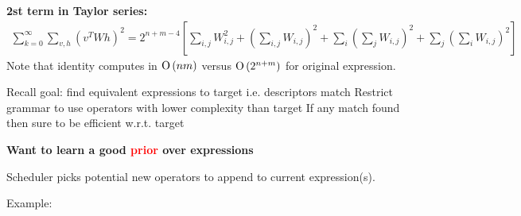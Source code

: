 \documentclass[landscape,a0b]{a0poster_csml_v2}
\begin{document}
\begin{poster}
\begin{PosterColumn}
  {\bf 2st term in Taylor series:}
  \begin{align*}
    \sum_{k=0}^\infty \sum_{v,h} (v^TWh)^2 = 2^{n + m - 4} [\sum_{i, j}W_{i, j}^2 + (\sum_{i, j} W_{i, j})^2 + \sum_i (\sum_j W_{i, j})^2 + \sum_j (\sum_i W_{i, j})^2]
  \end{align*}
  Note that identity computes in $\operatorname{O}\left(nm\right)$ versus $\operatorname{O}\left(2^{n + m}\right)$ for original expression.
\vspace{0.7cm}



Recall goal: find equivalent expressions to target
i.e. descriptors match
Restrict grammar to use operators with lower complexity than target
If any match found then sure to be efficient w.r.t. target
\vspace{-0.8cm}
\begin{center}
{\bf Want to learn a good \textcolor{red}{prior} over expressions}
\end{center}

\vspace{-0.2cm}
\textcolor{anublue}{Scheduler} picks potential new operators to append to current expression(s).

Example:


\end{PosterColumn}
\end{poster}
\end{document}
